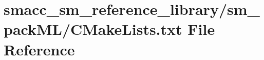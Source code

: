 \hypertarget{sm__reference__library_2sm__packML_2CMakeLists_8txt}{}\section{smacc\+\_\+sm\+\_\+reference\+\_\+library/sm\+\_\+pack\+M\+L/\+C\+Make\+Lists.txt File Reference}
\label{sm__reference__library_2sm__packML_2CMakeLists_8txt}
